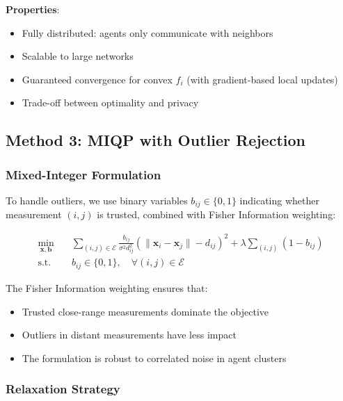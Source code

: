 \documentclass[11pt,a4paper]{article}
\begin{document}
\textbf{Properties}:
\begin{itemize}
    \item Fully distributed: agents only communicate with neighbors
    \item Scalable to large networks
    \item Guaranteed convergence for convex $f_i$ (with gradient-based local updates)
    \item Trade-off between optimality and privacy
\end{itemize}

\subsection{Method 3: MIQP with Outlier Rejection}
\label{sec:MIQP}

\subsubsection{Mixed-Integer Formulation}

To handle outliers, we use binary variables $b_{ij} \in \{0, 1\}$ indicating whether measurement $(i,j)$ is trusted, combined with Fisher Information weighting:

\begin{equation}
\boxed{
\begin{aligned}
\min_{\mathbf{x}, \mathbf{b}} \quad & \sum_{(i,j) \in \mathcal{E}} \frac{b_{ij}}{\sigma^2 d_{ij}^2} \left(\|\mathbf{x}_i - \mathbf{x}_j\| - d_{ij}\right)^2 + \lambda \sum_{(i,j)} (1 - b_{ij}) \\
\text{s.t.} \quad & b_{ij} \in \{0, 1\}, \quad \forall (i,j) \in \mathcal{E}
\end{aligned}
}
\label{eq:miqp}
\end{equation}

The Fisher Information weighting ensures that:
\begin{itemize}
    \item Trusted close-range measurements dominate the objective
    \item Outliers in distant measurements have less impact
    \item The formulation is robust to correlated noise in agent clusters
\end{itemize}

\subsubsection{Relaxation Strategy}
\end{document}
